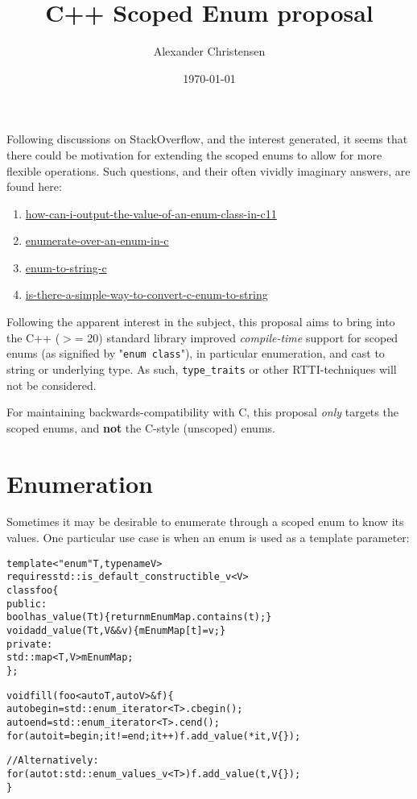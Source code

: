 \documentclass[a4paper, 12pt]{article}
\title{C++ Scoped Enum proposal}
\author{\small Alexander Christensen}
\date{\vspace{-2mm}\small \today}
\begin{document}
\maketitle

Following discussions on StackOverflow, and the interest generated, it seems
that there could be motivation for extending the scoped enums to allow for
more flexible operations. Such questions, and their often vividly imaginary
answers, are found here:

\begin{enumerate}
\item \href{https://stackoverflow.com/questions/11421432/how-can-i-output-the-value-of-an-enum-class-in-c11}{how-can-i-output-the-value-of-an-enum-class-in-c11}
\item \href{https://stackoverflow.com/questions/1390703/enumerate-over-an-enum-in-c}{enumerate-over-an-enum-in-c}
\item \href{https://stackoverflow.com/questions/6281461/enum-to-string-c}{enum-to-string-c}
\item \href{https://stackoverflow.com/questions/201593/is-there-a-simple-way-to-convert-c-enum-to-string}{is-there-a-simple-way-to-convert-c-enum-to-string}
\end{enumerate}

Following the apparent interest in the subject, this proposal aims to bring
into the C++ ($>$= 20) standard library improved \textit{compile-time} support
for scoped enums (as signified by "\texttt{enum class}"), in particular
enumeration, and cast to string or underlying type. As such, \texttt{type\_traits}
or other RTTI-techniques will not be considered.

For maintaining backwards-compatibility with C, this proposal \textit{only}
targets the scoped enums, and \textbf{not} the C-style (unscoped) enums.


\section{Enumeration}

Sometimes it may be desirable to enumerate through a scoped enum to know its
values. One particular use case is when an enum is used as a template parameter:

\begin{alltt}\footnotesize
template<"enum" T, typename V>
requires std::is\_default\_constructible\_v<V>
class foo \{
public:
  bool has\_value(T t) \{ return mEnumMap.contains(t); \}
  void add\_value(T t, V&& v) \{ mEnumMap[t] = v; \}
private:
  std::map<T, V> mEnumMap;
\};

void fill(foo<auto T, auto V>& f) \{
  auto begin = std::enum\_iterator<T>.cbegin();
  auto end = std::enum\_iterator<T>.cend();
  for (auto it = begin; it != end; it++) { f.add\_value(*it, V\{\}); }

  // Alternatively:
  for (auto t : std::enum\_values\_v<T>) { f.add\_value(t, V\{\}); }
\}
\end{alltt}
\end{document}
